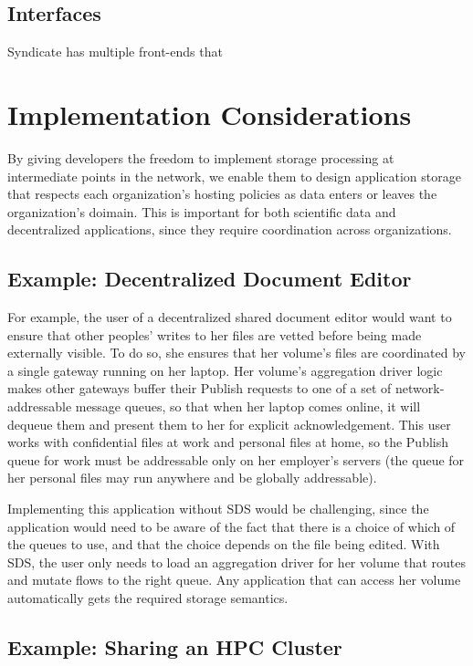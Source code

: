\subsection{Interfaces}

Syndicate has multiple front-ends that 



\section{Implementation Considerations}

By giving developers the freedom to implement storage processing at intermediate
points in the network, we enable them to design application storage that
respects each organization's hosting policies as data enters or leaves the
organization's doimain.  This is important for both scientific data and
decentralized applications, since they require coordination across
organizations.

\subsection{Example: Decentralized Document Editor}

For example, the user of a decentralized shared document editor
would want to ensure that other peoples' writes to her files are vetted
before being made externally visible.  To do so, she ensures that her volume's files
are coordinated by a single gateway running on her laptop.
Her volume's aggregation driver logic makes other
gateways buffer their Publish requests to one of a set of network-addressable
message queues, so that when
her laptop comes online, it will dequeue them and present them to her for
explicit acknowledgement.  This user works with confidential files at work and
personal files at home, so the Publish queue for work must be addressable only
on her employer's servers (the queue for her personal files may run anywhere and
be globally addressable).

Implementing this application without SDS would be
challenging, since the application would need to be aware of the fact
that there is a choice of which of the queues to use, and that the choice depends on
the file being edited.  With SDS, the
user only needs to load an aggregation driver for her volume that routes 
and mutate flows to the right queue.  Any application that can access her volume
automatically gets the required storage semantics.

\subsection{Example: Sharing an HPC Cluster}


